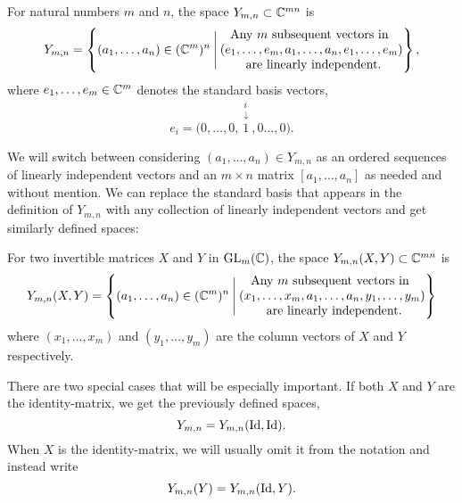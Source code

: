 \begin{definition} 
  For natural numbers $m$ and $n$, the space $Y_{m,n}\subset \mathbb{C}^{mn}$
  is 
  \[ Y_{m,n} = \left\{ (a_1,\dots,a_n) \in (\mathbb{C}^m)^n \:\Bigg\vert\:
    \begin{matrix}
      \text{Any } m \text{ subsequent vectors in } \\
      (e_1,\dots,e_m,a_1,\dots,a_n,e_1,\dots,e_m) \\
      \text{ are linearly independent.}
    \end{matrix}  \right\}, \]
  where $e_1,\dots,e_m \in \mathbb{C}^m$ denotes the standard basis
  vectors,
  \[ e_i =
  \big(0,\dots,0,\overset{\substack{i\\\downarrow}}{1},0\dots,0\big).\]

\end{definition}
We will switch between considering $(a_1,\dots,a_n)\in Y_{m,n}$ as an
ordered sequences of linearly independent vectors and an $m\times n$
matrix $[a_1,\dots,a_n]$ as needed and without mention. We can replace
the standard basis that appears in the definition of $Y_{m,n}$ with
any collection of linearly independent vectors and get similarly
defined spaces: 
\begin{definition}
  \label{def:rum}
  For two invertible matrices $X$ and $Y$ in
  $\operatorname{GL}_m(\mathbb{C})$, the space $Y_{m,n}(X,Y) \subset \mathbb{C}^{mn}$ is
  \[ Y_{m,n}(X,Y) = \left\{ (a_1,\dots,a_n) \in (\mathbb{C}^m)^n
    \:\Bigg\vert\: 
    \begin{matrix}
      \text{Any } m \text{ subsequent vectors in } \\
      (x_1,\dots,x_m,a_1,\dots,a_n,y_1,\dots,y_m) \\
      \text{ are linearly independent.}
    \end{matrix}  \right\} \]
  where $(x_1,\dots,x_m)$ and $(y_1,\dots,y_m)$ are the column vectors
  of $X$ and $Y$ respectively.
  
  There are two special cases that will be especially important.
  If both $X$ and $Y$ are the identity-matrix, we get the previously
  defined spaces,
  \[ Y_{m,n} = Y_{m,n}(\operatorname{Id},\operatorname{Id}). \]
  When $X$ is the identity-matrix, we will usually omit it from the
  notation and instead write
  \[ Y_{m,n}(Y) = Y_{m,n}(\operatorname{Id},Y). \]
\end{definition}

